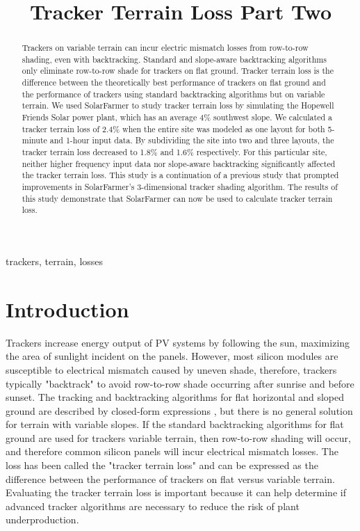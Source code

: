 \documentclass[conference]{IEEEtran}
\begin{document}
\title{Tracker Terrain Loss Part Two}

\author{
	}

\maketitle

\begin{abstract}
Trackers on variable terrain can incur electric mismatch losses from row-to-row shading, even with backtracking. Standard and slope-aware backtracking algorithms only eliminate row-to-row shade for trackers on flat ground. Tracker terrain loss is the difference between the theoretically best performance of trackers on flat ground and the performance of trackers using standard backtracking algorithms but on variable terrain. We used SolarFarmer to study tracker terrain loss by simulating the Hopewell Friends Solar power plant, which has an average 4\% southwest slope. We calculated a tracker terrain loss of 2.4\% when the entire site was modeled as one layout for both 5-minute and 1-hour input data. By subdividing the site into two and three layouts, the tracker terrain loss decreased to 1.8\% and 1.6\% respectively. For this particular site, neither higher frequency input data nor slope-aware backtracking significantly affected the tracker terrain loss. This study is a continuation of a previous study that prompted improvements in SolarFarmer's 3-dimensional tracker shading algorithm. The results of this study demonstrate that SolarFarmer can now be used to calculate tracker terrain loss.
\end{abstract}

\begin{IEEEkeywords}
trackers, terrain, losses
\end{IEEEkeywords}

\section{Introduction}
Trackers increase energy output of PV systems by following the sun, maximizing the area of sunlight incident on the panels. However, most silicon modules are susceptible to electrical mismatch caused by uneven shade, therefore, trackers typically "backtrack" to avoid  row-to-row shade occurring after sunrise and before sunset. The tracking and backtracking algorithms for flat horizontal and sloped ground are described by closed-form expressions \cite{Marion2013,Anderson2020}, but there is no general solution for terrain with variable slopes. If the standard backtracking algorithms for flat ground are used for trackers variable terrain, then row-to-row shading will occur, and therefore common silicon panels will incur electrical mismatch losses. The loss has been called the "tracker terrain loss" and can be expressed as the difference between the performance of trackers on flat versus variable terrain. Evaluating the tracker terrain loss is important because it can help determine if advanced tracker algorithms are necessary to reduce the risk of plant underproduction.
\end{document}
